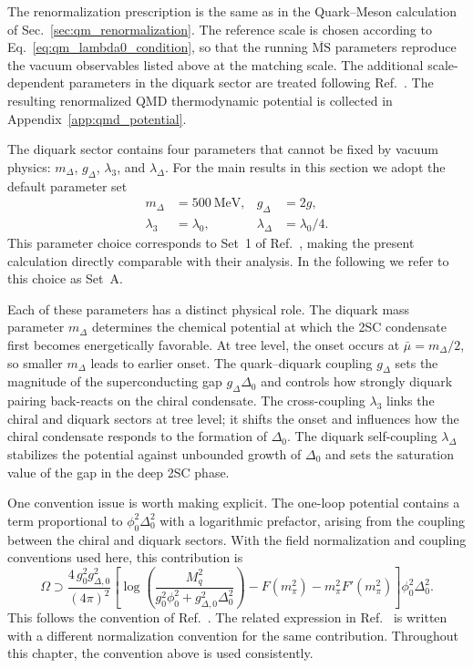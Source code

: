 The renormalization prescription is the same as in the Quark--Meson
calculation of Sec.~\ref{sec:qm_renormalization}. The reference scale is
chosen according to Eq.~\eqref{eq:qm_lambda0_condition}, so that the
running \(\overline{\mathrm{MS}}\) parameters reproduce the vacuum
observables listed above at the matching scale. The additional
scale-dependent parameters in the diquark sector are treated following
Ref.~\cite{Andersen2024}. The resulting renormalized QMD thermodynamic
potential is collected in Appendix~\ref{app:qmd_potential}.

The diquark sector contains four parameters that cannot be fixed by
vacuum physics: \(m_\Delta\), \(g_\Delta\), \(\lambda_3\), and
\(\lambda_\Delta\). For the main results in this section we adopt the
default parameter set
\begin{align}
m_\Delta &= 500~\mathrm{MeV}, &
g_\Delta &= 2g, \\
\lambda_3 &= \lambda_0, &
\lambda_\Delta &= \lambda_0/4 .
\end{align}
This parameter choice corresponds to Set~1 of
Ref.~\cite{Andersen2025}, making the present calculation directly
comparable with their analysis. In the following we refer to this
choice as Set~A.

Each of these parameters has a distinct physical role. The diquark mass
parameter \(m_\Delta\) determines the chemical potential at which the
2SC condensate first becomes energetically favorable. At tree level,
the onset occurs at \(\bar{\mu} = m_\Delta/2\), so smaller
\(m_\Delta\) leads to earlier onset. The quark--diquark coupling
\(g_\Delta\) sets the magnitude of the superconducting gap
\(g_\Delta \Delta_0\) and controls how strongly diquark pairing
back-reacts on the chiral condensate. The cross-coupling
\(\lambda_3\) links the chiral and diquark sectors at tree level; it
shifts the onset and influences how the chiral condensate responds to
the formation of \(\Delta_0\). The diquark self-coupling
\(\lambda_\Delta\) stabilizes the potential against unbounded growth
of \(\Delta_0\) and sets the saturation value of the gap in the deep
2SC phase.

One convention issue is worth making explicit. The one-loop potential
contains a term proportional to \(\phi_0^2\Delta_0^2\) with a
logarithmic prefactor, arising from the coupling between the chiral and
diquark sectors. With the field normalization and coupling conventions
used here, this contribution is
\begin{equation}
\Omega \supset
\frac{4\, g_0^2 g_{\Delta,0}^2}{(4\pi)^2}
\left[
\log\!\left(\frac{M_q^2}{g_0^2\phi_0^2 + g_{\Delta,0}^2\Delta_0^2}\right)
- F(m_\pi^2) - m_\pi^2 F'(m_\pi^2)
\right]
\phi_0^2 \Delta_0^2 .
\label{eq:mixed_log_term}
\end{equation}
This follows the convention of Ref.~\cite{Andersen2024}. The related
expression in Ref.~\cite{Andersen2025} is written with a different
normalization convention for the same contribution. Throughout this
chapter, the convention above is used consistently.

